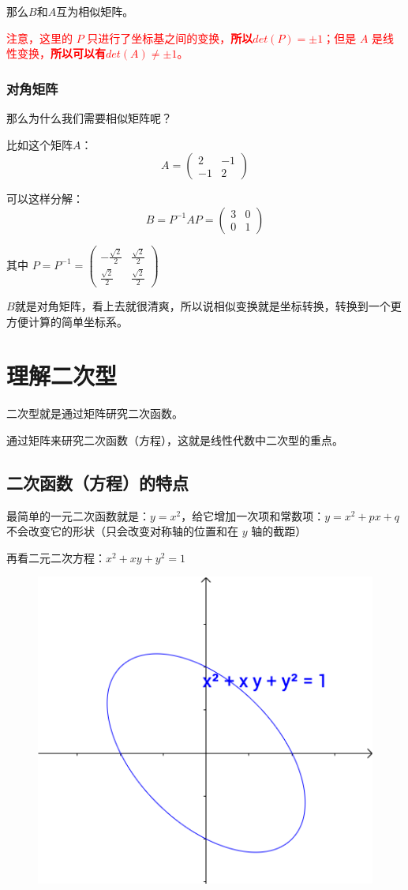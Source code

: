 \documentclass[12pt]{article}
\begin{document}
那么$B$和$A$互为相似矩阵。

\textcolor{red}{注意，这里的 $P$ 只进行了坐标基之间的变换，\textbf{所以$det(P) = \pm 1$}；但是 $A$ 是线性变换，\textbf{所以可以有$det(A) \ne \pm 1$}。}

\subsubsection{对角矩阵}
那么为什么我们需要相似矩阵呢？

比如这个矩阵$A$：
$$
A = \begin{pmatrix}2&-1\\-1&2\end{pmatrix}
$$

可以这样分解：
$$
B = P^{-1}AP = \begin{pmatrix}3&0\\0&1\end{pmatrix}
$$

其中 $P = P^{-1} = \begin{pmatrix}
-\frac{\sqrt{2}}{2}&\frac{\sqrt{2}}{2}\\
\frac{\sqrt{2}}{2}&\frac{\sqrt{2}}{2}
\end{pmatrix}$

$B$就是对角矩阵，看上去就很清爽，所以说相似变换就是坐标转换，转换到一个更方便计算的简单坐标系。

\section{理解二次型\cite{How_To_Understand_Quadratic_Form}}
二次型就是通过矩阵研究二次函数。

通过矩阵来研究二次函数（方程），这就是线性代数中二次型的重点。

\subsection{二次函数（方程）的特点}
最简单的一元二次函数就是：$y = x^2$，给它增加一次项和常数项：$y = x^2 + px + q$ 不会改变它的形状（只会改变对称轴的位置和在 $y$ 轴的截距）

再看二元二次方程：$x^2 + xy + y^2 = 1$
\begin{figure}[H]
    \centering
    \includegraphics[width=.3\textwidth]{fig/UnderstandQuadraticForm_1.png}
\end{figure} 
\end{document}
